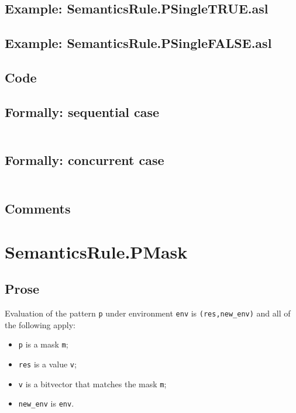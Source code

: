 \documentclass{book}
\begin{document}
    \subsection{Example: SemanticsRule.PSingleTRUE.asl}

    \subsection{Example: SemanticsRule.PSingleFALSE.asl}

  \subsection{Code}

  \subsection{Formally: sequential case}
  \begin{align}
  \end{align} 

  \subsection{Formally: concurrent case}
  \begin{align}
  \end{align} 

    \subsection{Comments}

\section{SemanticsRule.PMask \label{sec:SemanticsRule.PMask}}

    \subsection{Prose}
   Evaluation of the pattern \texttt{p} under environment \texttt{env} is
  \texttt{(res,new\_env)} and all of the following apply:
    \begin{itemize}
    \item \texttt{p} is a mask \texttt{m};
    \item \texttt{res} is a value \texttt{v};
    \item \texttt{v} is a bitvector that matches the mask \texttt{m};
    \item \texttt{new\_env} is \texttt{env}.
    \end{itemize}
\end{document}
